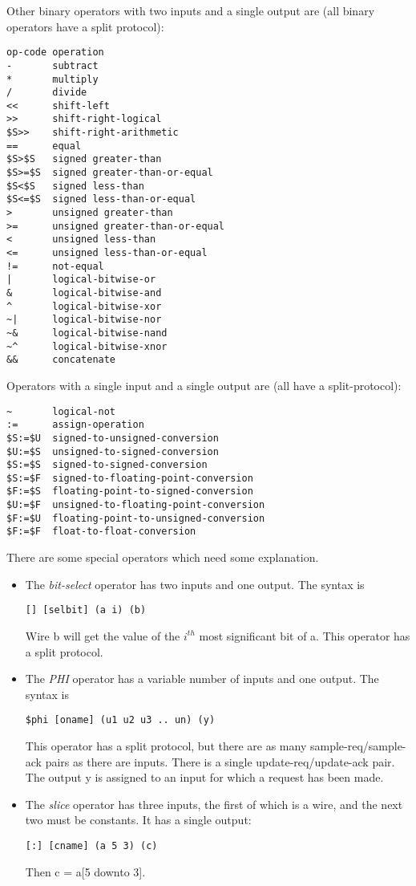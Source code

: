 \documentclass{article}
\begin{document}
Other binary operators with two inputs and a single
output are (all binary operators have a split protocol): 
\begin{verbatim}
op-code operation             
-       subtract             
*       multiply            
/       divide             
<<      shift-left        
>>      shift-right-logical 
$S>>    shift-right-arithmetic
==      equal              
$S>$S   signed greater-than
$S>=$S  signed greater-than-or-equal
$S<$S   signed less-than
$S<=$S  signed less-than-or-equal
>       unsigned greater-than
>=      unsigned greater-than-or-equal
<       unsigned less-than
<=      unsigned less-than-or-equal
!=      not-equal
|       logical-bitwise-or
&       logical-bitwise-and
^       logical-bitwise-xor
~|      logical-bitwise-nor
~&      logical-bitwise-nand
~^      logical-bitwise-xnor
&&      concatenate
\end{verbatim}

Operators with a single input and a single
output are (all have a split-protocol):
\begin{verbatim}
~       logical-not
:=      assign-operation
$S:=$U  signed-to-unsigned-conversion
$U:=$S  unsigned-to-signed-conversion
$S:=$S  signed-to-signed-conversion
$S:=$F  signed-to-floating-point-conversion
$F:=$S  floating-point-to-signed-conversion
$U:=$F  unsigned-to-floating-point-conversion
$F:=$U  floating-point-to-unsigned-conversion
$F:=$F  float-to-float-conversion
\end{verbatim}

There are some special operators which
need some explanation.
\begin{itemize}
\item The {\em bit-select} operator has two inputs and
one output.  The syntax is
\begin{verbatim}
[] [selbit] (a i) (b)
\end{verbatim}
Wire b will get the value of the $i^{th}$ most significant bit
of a.  This operator has a split protocol. 
\item  The {\em PHI} operator has a variable number of inputs
and one output.  The syntax is
\begin{verbatim}
$phi [oname] (u1 u2 u3 .. un) (y)
\end{verbatim}
This operator has a split protocol, but there are as many
sample-req/sample-ack pairs as there are inputs.  There is a
single update-req/update-ack pair.  The output y
is assigned to an input for which a request has been made.
\item The {\em slice} operator has three inputs, the first
of which is a wire, and the next two must be constants.
It has a single output:
\begin{verbatim}
[:] [cname] (a 5 3) (c)
\end{verbatim}
Then c = a[5 downto 3].
\end{itemize} 
\end{document}
